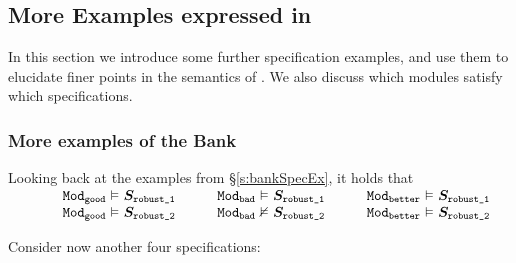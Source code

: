 \subsection{More Examples expressed in \Nec}
\label{s:expressiveness}

In this section we introduce some further specification examples, and use them to elucidate finer points
in the semantics of \Nec. We also  discuss which modules    satisfy  which specifications.

 \subsubsection{More examples of the Bank}
Looking back at the examples from  \S\ref{s:bankSpecEx},   it holds that
  \\
  $\begin{array}{llll}
  \ \  \ \ \ \ \ & \ModA \vDash  \SrobustA    \ \ \ \ \ \ & \ModB \vDash \SrobustA \ \ \ \ \ \
  &  \ModC \vDash \SrobustA
  \\
 &  \ModA \vDash  \SrobustB    \ \ \ \ \ & \ModB \nvDash \SrobustB \ \ \ \ \ 
  &  \ModC \vDash \SrobustB
  \end{array}$
 
 

 
Consider now another four \Nec specifications:
 
